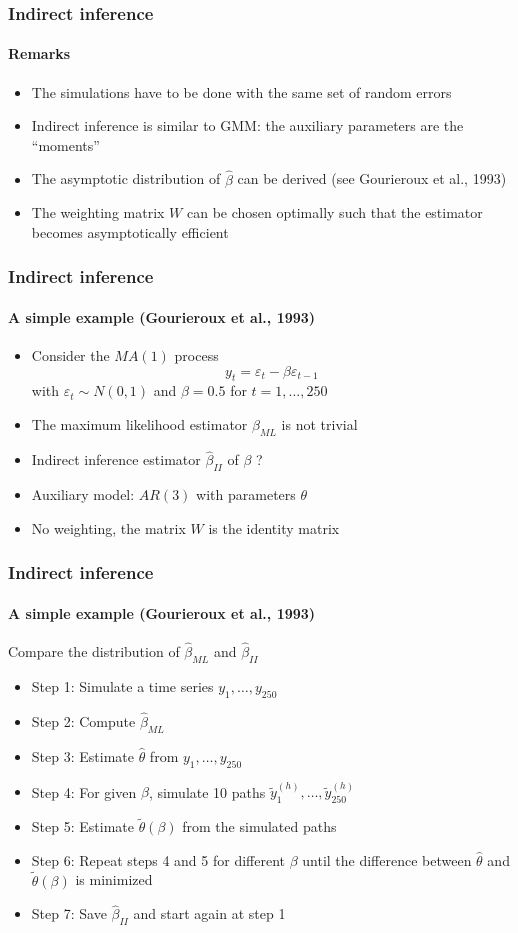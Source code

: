 \documentclass{beamer}
\begin{document}
\begin{frame}\frametitle{Indirect inference}\framesubtitle{Remarks}
\begin{itemize}
\item The simulations have to be done with the same set of random errors
\item Indirect inference is similar to GMM: the auxiliary parameters are the \textquotedblleft moments\textquotedblright
\item The asymptotic distribution of $\hat{\beta}$ can be derived (see Gourieroux et al., 1993)
\item The weighting matrix $W$ can be chosen optimally such that the estimator becomes asymptotically efficient
\end{itemize}
\end{frame}


\begin{frame}\frametitle{Indirect inference}\framesubtitle{A simple example (Gourieroux et al., 1993)}
\begin{itemize}
    \item Consider the $MA(1)$ process
    \begin{equation*}
    y_{t}=\varepsilon _{t}-\beta \varepsilon _{t-1}
    \end{equation*}
    with $\varepsilon _{t}\sim N(0,1)$ and $\beta =0.5$ for $t=1,\ldots ,250$
    \item The maximum likelihood estimator $\hat{\beta}_{ML}$ is not trivial
    \item Indirect inference estimator $\hat{\beta}_{II}$ of $\beta $ ?
    \item Auxiliary model: $AR(3)$ with parameters $\theta $
    \item No weighting, the matrix $W$ is the identity matrix
\end{itemize}
\end{frame}


\begin{frame}\frametitle{Indirect inference}\framesubtitle{A simple example (Gourieroux et al., 1993)}
Compare the distribution of $\hat{\beta}_{ML}$ and $\hat{\beta}_{II}$
\begin{itemize}
    \item Step 1: Simulate a time series $y_{1},\ldots ,y_{250}$
    \item Step 2: Compute $\hat{\beta}_{ML}$
    \item Step 3: Estimate $\hat{\theta}$ from $y_{1},\ldots ,y_{250}$
    \item Step 4: For given $\beta $, simulate 10 paths $\tilde{y}_{1}^{(h)},\ldots ,\tilde{y}_{250}^{(h)}$
    \item Step 5: Estimate $\tilde{\theta}(\beta )$ from the simulated paths
    \item Step 6: Repeat steps 4 and 5 for different $\beta $ until the difference between $\hat{\theta}$ and $\tilde{\theta}(\beta )$ is minimized
    \item Step 7: Save $\hat{\beta}_{II}$ and start again at step 1
\end{itemize}
\end{frame}
\end{document}
